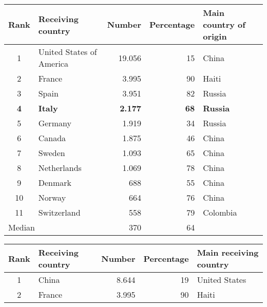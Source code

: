 \begin{table}[ht]
   \centering
   \begin{tabular}{c l r r l}
      Rank & Receiving country & Number & Percentage & Main country of origin\\
      \hline
      1 & United States of America & 19.056 & 15 & China\\
      2 & France & 3.995 & 90 & Haiti\\
      3 & Spain & 3.951 & 82 & Russia\\
      \textcolor{BrickRed}{\textbf{4}} & \textcolor{BrickRed}{\textbf{Italy}} & \textcolor{BrickRed}{\textbf{2.177}} & \textcolor{BrickRed}{\textbf{68}} & \textcolor{BrickRed}{\textbf{Russia}}\\
      5 & Germany & 1.919 & 34 & Russia\\
      6 & Canada & 1.875 & 46 & China\\
      7 & Sweden & 1.093 & 65 & China\\
      8 & Netherlands & 1.069 & 78 & China\\
      9 & Denmark & 688 & 55 & China\\
      10 & Norway & 664 & 76 & China\\
      11 & Switzerland & 558 & 79 & Colombia\\
      \hline
      \multicolumn{2}{l}{Median} & 370 & 64 &\\
   \end{tabular}
    \label{tab:intadoptcountriesdestination}
\end{table}

\begin{table}[ht]
   \centering
   \begin{tabular}{c l r r l}
      Rank & Receiving country & Number & Percentage & Main receiving country\\
      \hline
      1 & China & 8.644 & 19 & United States\\
      2 & France & 3.995 & 90 & Haiti\\
   
   \end{tabular}
    \label{tab:intadoptcountriesorigin}
\end{table}

